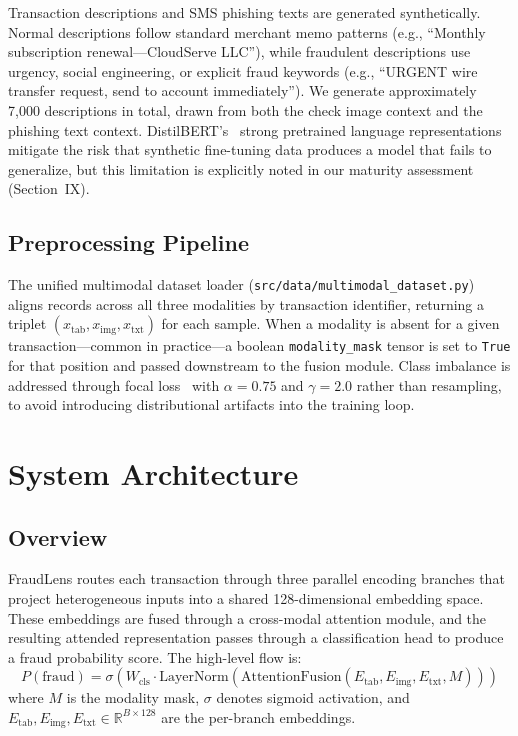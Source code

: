 \documentclass[10pt,conference,letterpaper]{IEEEtran}
\begin{document}
Transaction descriptions and SMS phishing texts are generated synthetically. Normal
descriptions follow standard merchant memo patterns
(e.g., ``Monthly subscription renewal---CloudServe LLC''), while fraudulent descriptions
use urgency, social engineering, or explicit fraud keywords
(e.g., ``URGENT wire transfer request, send to account immediately''). We generate
approximately 7,000 descriptions in total, drawn from both the check image context and
the phishing text context. DistilBERT's~\cite{BERT} strong pretrained language
representations mitigate the risk that synthetic fine-tuning data produces a model that
fails to generalize, but this limitation is explicitly noted in our maturity assessment
(Section~IX).

\subsection{Preprocessing Pipeline}

The unified multimodal dataset loader (\texttt{src/data/multimodal\_dataset.py}) aligns
records across all three modalities by transaction identifier, returning a triplet
$(x_\text{tab}, x_\text{img}, x_\text{txt})$ for each sample. When a modality is
absent for a given transaction---common in practice---a boolean \texttt{modality\_mask}
tensor is set to \texttt{True} for that position and passed downstream to the fusion
module. Class imbalance is addressed through focal loss~\cite{FocalLoss} with
$\alpha=0.75$ and $\gamma=2.0$ rather than resampling, to avoid introducing
distributional artifacts into the training loop.

\section{System Architecture}

\subsection{Overview}

FraudLens routes each transaction through three parallel encoding branches that project
heterogeneous inputs into a shared 128-dimensional embedding space. These embeddings are
fused through a cross-modal attention module, and the resulting attended representation
passes through a classification head to produce a fraud probability score. The
high-level flow is:
\begin{equation}
P(\text{fraud}) = \sigma\!\left(W_\text{cls} \cdot \text{LayerNorm}(\text{AttentionFusion}(E_\text{tab}, E_\text{img}, E_\text{txt}, M))\right)
\end{equation}
where $M$ is the modality mask, $\sigma$ denotes sigmoid activation, and
$E_\text{tab}, E_\text{img}, E_\text{txt} \in \mathbb{R}^{B \times 128}$ are the
per-branch embeddings.
\end{document}
